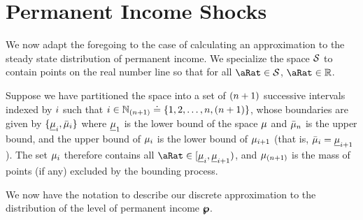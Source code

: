 \documentclass[\econtexRoot/BufferStockTheory.tex]{subfiles}
\begin{document}

\section{Permanent Income Shocks}

We now adapt the foregoing to the case of calculating an approximation to the steady state distribution of permanent income. We specialize the space $\mathcal{S}$ to contain points on the real number line so that for all $\pnt \in \SetFullCnts$, $\pnt \in \reals$.

Suppose we have partitioned the space into a set of $(n+1)$ successive intervals indexed by $i$ such that $i \in \mathbb{N}_{(n+1)} \doteq \{1,2,\dots,n,(n+1)\}$, whose boundaries are given by $\{\underline{\mu}_{i},\bar{\mu}_{i}\}$ where $\underline{\mu}_{1}$ is the lower bound of the space $\mu$ and $\bar{\mu}_{n}$ is the upper bound, and the upper bound of $\mu_{i}$ is the lower bound of $\mu_{i+1}$ (that is, $\bar{\mu}_{i}=\underline{\mu}_{i+1}$).  The set $\mu_{i}$ therefore contains all  $\pnt \in [\Bot{\SetPartCnts}_{\thisBin},\Bot{\SetPartCnts}_{\thisBin+1})$, and $\mu_{(n+1)}$ is the mass of points (if any) excluded by the bounding process.

We now have the notation to describe our discrete approximation to the distribution of the level of permanent income $\pmb{\wp}$.  %


\end{document}
